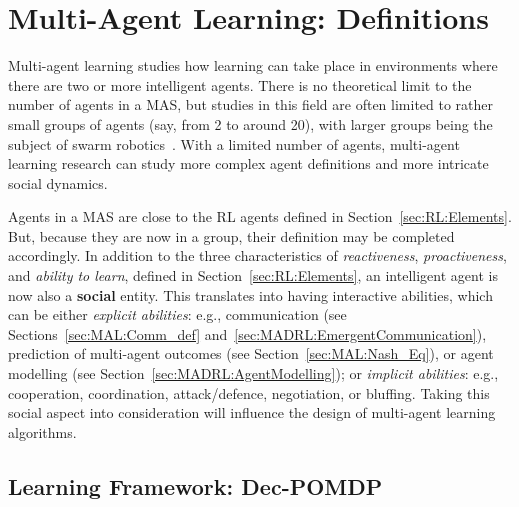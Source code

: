 
\section{Multi-Agent Learning: Definitions}\label{sec:MALearning}

Multi-agent learning studies how learning can take place in environments where there are two or more intelligent agents. There is no theoretical limit to the number of agents in a MAS, but studies in this field are often limited to rather small groups of agents (say, from 2 to around 20), with larger groups being the subject of swarm robotics~\citep{Hamann2018_SwarmRobotics}. With a limited number of agents, multi-agent learning research can study more complex agent definitions and more intricate social dynamics. 

Agents in a MAS are close to the RL agents defined in Section~\ref{sec:RL:Elements}. But, because they are now in a group, their definition may be completed accordingly. In addition to the three characteristics of \textit{reactiveness}, \textit{proactiveness}, and \textit{ability to learn}, defined in Section~\ref{sec:RL:Elements}, an intelligent agent is now also a \textbf{social} entity. This translates into having interactive abilities, which can be either \textit{explicit abilities}: e.g., communication (see Sections~\ref{sec:MAL:Comm_def} and~\ref{sec:MADRL:EmergentCommunication}), prediction of multi-agent outcomes (see Section~\ref{sec:MAL:Nash_Eq}), or agent modelling (see Section~\ref{sec:MADRL:AgentModelling}); or \textit{implicit abilities}: e.g., cooperation, coordination, attack/defence, negotiation, or bluffing. Taking this social aspect into consideration will influence the design of multi-agent learning algorithms. 




\subsection{Learning Framework: Dec-POMDP}\label{sec:MAL:Dec-POMDP}

